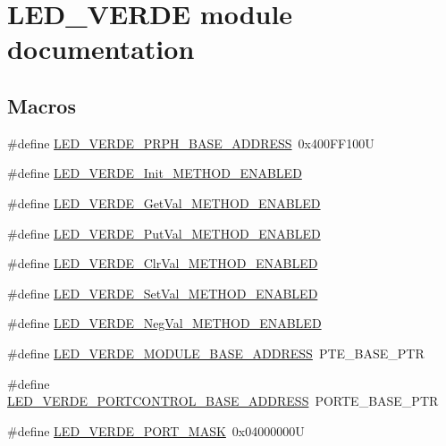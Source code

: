 \hypertarget{group___l_e_d___v_e_r_d_e__module}{}\section{L\+E\+D\+\_\+\+V\+E\+R\+DE module documentation}
\label{group___l_e_d___v_e_r_d_e__module}
\subsection*{Macros}
\begin{DoxyCompactItemize}
\item 
\#define \hyperlink{group___l_e_d___v_e_r_d_e__module_ga4aec34654e3db65a3430669ad7367a3f}{L\+E\+D\+\_\+\+V\+E\+R\+D\+E\+\_\+\+P\+R\+P\+H\+\_\+\+B\+A\+S\+E\+\_\+\+A\+D\+D\+R\+E\+SS}~0x400\+F\+F100U
\item 
\#define \hyperlink{group___l_e_d___v_e_r_d_e__module_gafe01ff33ae4ac72f5cd8949227c9f340}{L\+E\+D\+\_\+\+V\+E\+R\+D\+E\+\_\+\+Init\+\_\+\+M\+E\+T\+H\+O\+D\+\_\+\+E\+N\+A\+B\+L\+ED}
\item 
\#define \hyperlink{group___l_e_d___v_e_r_d_e__module_gae4596439b5d682d82314539bb959629e}{L\+E\+D\+\_\+\+V\+E\+R\+D\+E\+\_\+\+Get\+Val\+\_\+\+M\+E\+T\+H\+O\+D\+\_\+\+E\+N\+A\+B\+L\+ED}
\item 
\#define \hyperlink{group___l_e_d___v_e_r_d_e__module_gad7252232bbc13f6f8d2bab3d3005cd2a}{L\+E\+D\+\_\+\+V\+E\+R\+D\+E\+\_\+\+Put\+Val\+\_\+\+M\+E\+T\+H\+O\+D\+\_\+\+E\+N\+A\+B\+L\+ED}
\item 
\#define \hyperlink{group___l_e_d___v_e_r_d_e__module_gad869eafd793e8bb62fd1aa95dfcf9d43}{L\+E\+D\+\_\+\+V\+E\+R\+D\+E\+\_\+\+Clr\+Val\+\_\+\+M\+E\+T\+H\+O\+D\+\_\+\+E\+N\+A\+B\+L\+ED}
\item 
\#define \hyperlink{group___l_e_d___v_e_r_d_e__module_ga26bbcfe60863f42065fbce3e702cb6c0}{L\+E\+D\+\_\+\+V\+E\+R\+D\+E\+\_\+\+Set\+Val\+\_\+\+M\+E\+T\+H\+O\+D\+\_\+\+E\+N\+A\+B\+L\+ED}
\item 
\#define \hyperlink{group___l_e_d___v_e_r_d_e__module_ga51aa95deb8d4e15a245f2e29853d987e}{L\+E\+D\+\_\+\+V\+E\+R\+D\+E\+\_\+\+Neg\+Val\+\_\+\+M\+E\+T\+H\+O\+D\+\_\+\+E\+N\+A\+B\+L\+ED}
\item 
\#define \hyperlink{group___l_e_d___v_e_r_d_e__module_gac85a2ae764dcfc317e8af0584cc94042}{L\+E\+D\+\_\+\+V\+E\+R\+D\+E\+\_\+\+M\+O\+D\+U\+L\+E\+\_\+\+B\+A\+S\+E\+\_\+\+A\+D\+D\+R\+E\+SS}~P\+T\+E\+\_\+\+B\+A\+S\+E\+\_\+\+P\+TR
\item 
\#define \hyperlink{group___l_e_d___v_e_r_d_e__module_ga7d8ceb7e776afb47469e25ef14d28aab}{L\+E\+D\+\_\+\+V\+E\+R\+D\+E\+\_\+\+P\+O\+R\+T\+C\+O\+N\+T\+R\+O\+L\+\_\+\+B\+A\+S\+E\+\_\+\+A\+D\+D\+R\+E\+SS}~P\+O\+R\+T\+E\+\_\+\+B\+A\+S\+E\+\_\+\+P\+TR
\item 
\#define \hyperlink{group___l_e_d___v_e_r_d_e__module_ga42c49efc741d85cf8a6be3c678db7d93}{L\+E\+D\+\_\+\+V\+E\+R\+D\+E\+\_\+\+P\+O\+R\+T\+\_\+\+M\+A\+SK}~0x04000000U
\end{DoxyCompactItemize}
